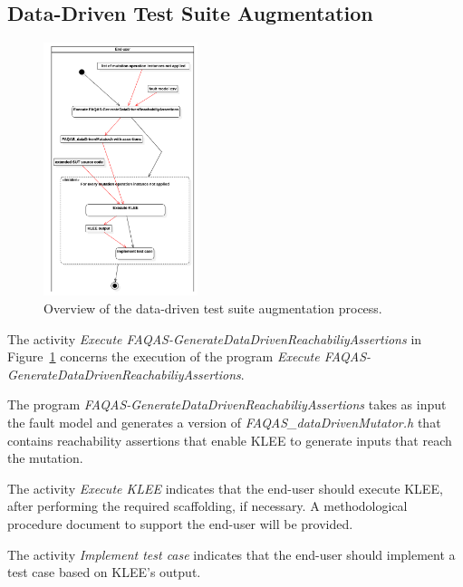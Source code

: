 

\subsection{Data-Driven Test Suite Augmentation}

\begin{figure}[]
  \centering
	\includegraphics[width=0.4\textwidth]{images/png/Activity1!DataDrivenTestSuiteAugmentation_4.png}
      \caption{Overview of the data-driven test suite augmentation process.}
      \label{fig:process:dataDriven:augment}
\end{figure}

The activity \emph{Execute FAQAS-GenerateDataDrivenReachabiliyAssertions} in Figure~\ref{fig:process:dataDriven:augment} concerns the execution of the program \emph{Execute FAQAS-GenerateDataDrivenReachabiliyAssertions}.

The program \emph{FAQAS-GenerateDataDrivenReachabiliyAssertions} takes as input the fault model and generates a version of \emph{FAQAS\_dataDrivenMutator.h} that contains reachability assertions that enable KLEE to generate inputs that reach the mutation.

The activity \emph{Execute KLEE} indicates that the end-user should execute KLEE, after performing the required scaffolding, if necessary. A methodological procedure document to support the end-user will be provided.

The activity \emph{Implement test case} indicates that the end-user should implement a test case based on KLEE's output.

